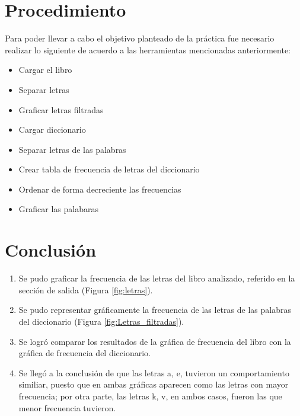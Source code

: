 \documentclass{article}
\begin{document}
\section{Procedimiento}
Para poder llevar a cabo el objetivo planteado de la práctica fue necesario realizar lo siguiente de acuerdo a las herramientas mencionadas anteriormente:
\begin{itemize}
    \item Cargar el libro
    \item Separar letras
    \item Graficar letras filtradas
    \item Cargar diccionario
    \item Separar letras de las palabras
    \item Crear tabla de frecuencia de letras del diccionario
    \item Ordenar de forma decreciente las frecuencias
    \item Graficar las palabaras 
\end{itemize} 
\section{Conclusión}
\begin{enumerate}
    \item Se pudo graficar la frecuencia de las letras del libro analizado, referido en la sección de salida (Figura \ref{fig:letras}).
    \item Se pudo representar gráficamente la frecuencia de las letras de las palabras del diccionario (Figura \ref{fig:Letras_filtradas}).
    \item Se logró comparar los resultados de la gráfica de frecuencia del libro con la gráfica de frecuencia del diccionario.
    \item Se llegó a la conclusión de que las letras a, e, tuvieron un comportamiento similiar, puesto que en ambas gráficas aparecen como las letras con mayor frecuencia; por otra parte, las letras k, v, en ambos casos, fueron las que menor frecuencia tuvieron.
\end{enumerate}


\clearpage
\end{document}

